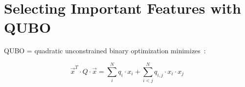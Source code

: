 \section{Selecting Important Features with QUBO} 

QUBO = quadratic unconstrained binary optimization minimizes~\cite{pasin:2024}:

\begin{equation*}
\vec{x}^{T} \cdot Q \cdot \vec{x} = \sum_{i}^{N} q_{i} \cdot x_{i} + \sum_{i<j}^N q_{i,j} \cdot x_{i} \cdot x_{j}
\end{equation*}


